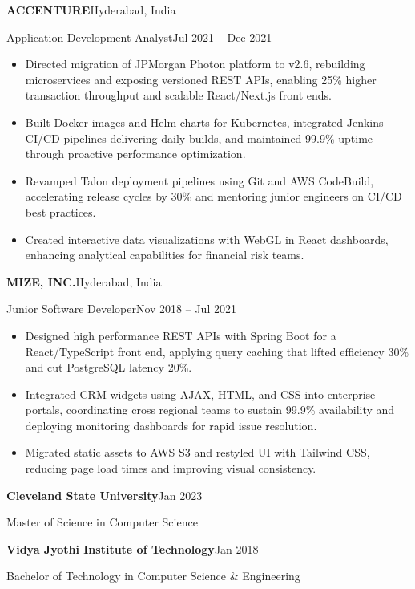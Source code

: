 \documentclass[10pt,letterpaper]{article}
\newcommand{\resumesection}[1]{%
  \vspace{7pt}{\large\bfseries\MakeUppercase{#1}}\par
  \vspace{1pt}{\color{rule}\hrule height 0.7pt}\vspace{3pt}%
}
\newenvironment{compactitem}{%
  \begin{itemize}
  \setlength{\leftmargin}{0.65em}
  \setlength{\labelsep}{0.35em}
  \setlength{\topsep}{1.5pt}
  \setlength{\itemsep}{1.4pt}
  \setlength{\parsep}{0pt}
  \setlength{\partopsep}{0pt}
}{\end{itemize}}
\newcommand{\role}[4]{%
  \vspace{3.5pt}%
  \textbf{\MakeUppercase{#1}}\hfill #2\par
  \textcolor{accent}{#3}\hfill #4\par
}
\begin{document}
\role{Accenture}{Hyderabad, India}{Application Development Analyst}{Jul 2021 -- Dec 2021}
\begin{compactitem}
  \item Directed migration of JPMorgan Photon platform to v2.6, rebuilding microservices and exposing versioned REST APIs, enabling 25\% higher transaction throughput and scalable React/Next.js front ends.
  \item Built Docker images and Helm charts for Kubernetes, integrated Jenkins CI/CD pipelines delivering daily builds, and maintained 99.9\% uptime through proactive performance optimization.
  \item Revamped Talon deployment pipelines using Git and AWS CodeBuild, accelerating release cycles by 30\% and mentoring junior engineers on CI/CD best practices.
  \item Created interactive data visualizations with WebGL in React dashboards, enhancing analytical capabilities for financial risk teams.
\end{compactitem}

\role{Mize, Inc.}{Hyderabad, India}{Junior Software Developer}{Nov 2018 -- Jul 2021}
\begin{compactitem}
  \item Designed high performance REST APIs with Spring Boot for a React/TypeScript front end, applying query caching that lifted efficiency 30\% and cut PostgreSQL latency 20\%.
  \item Integrated CRM widgets using AJAX, HTML, and CSS into enterprise portals, coordinating cross regional teams to sustain 99.9\% availability and deploying monitoring dashboards for rapid issue resolution.
  \item Migrated static assets to AWS S3 and restyled UI with Tailwind CSS, reducing page load times and improving visual consistency.
\end{compactitem}

\resumesection{Education}
\textbf{Cleveland State University}\hfill Jan 2023\par
\textcolor{accent}{Master of Science in Computer Science}\par
\vspace{4pt}
\textbf{Vidya Jyothi Institute of Technology}\hfill Jan 2018\par
\textcolor{accent}{Bachelor of Technology in Computer Science \& Engineering}
\end{document}
